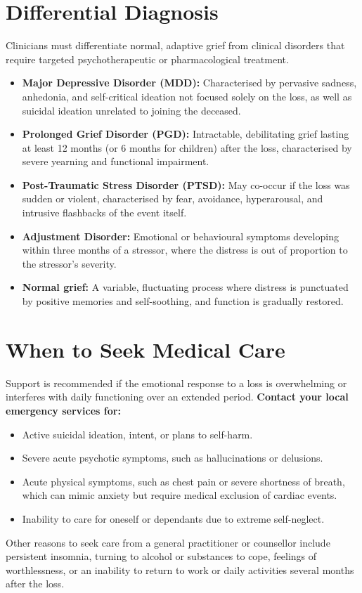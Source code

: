 \section*{Differential Diagnosis}
Clinicians must differentiate normal, adaptive grief from clinical disorders that require targeted psychotherapeutic or pharmacological treatment.
\begin{itemize}
    \item \textbf{Major Depressive Disorder (MDD):} Characterised by pervasive sadness, anhedonia, and self-critical ideation not focused solely on the loss, as well as suicidal ideation unrelated to joining the deceased.
    \item \textbf{Prolonged Grief Disorder (PGD):} Intractable, debilitating grief lasting at least 12 months (or 6 months for children) after the loss, characterised by severe yearning and functional impairment.
    \item \textbf{Post-Traumatic Stress Disorder (PTSD):} May co-occur if the loss was sudden or violent, characterised by fear, avoidance, hyperarousal, and intrusive flashbacks of the event itself.
    \item \textbf{Adjustment Disorder:} Emotional or behavioural symptoms developing within three months of a stressor, where the distress is out of proportion to the stressor's severity.
    \item \textbf{Normal grief:} A variable, fluctuating process where distress is punctuated by positive memories and self-soothing, and function is gradually restored.
\end{itemize}

\section*{When to Seek Medical Care}
Support is recommended if the emotional response to a loss is overwhelming or interferes with daily functioning over an extended period.
\textbf{Contact your local emergency services for:}
\begin{itemize}
    \item Active suicidal ideation, intent, or plans to self-harm.
    \item Severe acute psychotic symptoms, such as hallucinations or delusions.
    \item Acute physical symptoms, such as chest pain or severe shortness of breath, which can mimic anxiety but require medical exclusion of cardiac events.
    \item Inability to care for oneself or dependants due to extreme self-neglect.
\end{itemize}
Other reasons to seek care from a general practitioner or counsellor include persistent insomnia, turning to alcohol or substances to cope, feelings of worthlessness, or an inability to return to work or daily activities several months after the loss.

